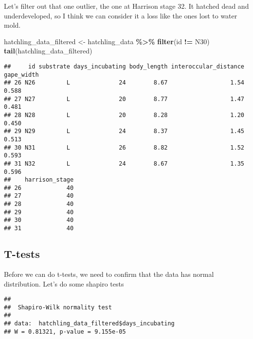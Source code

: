 \documentclass[
]{article}
\newenvironment{Shaded}{\begin{snugshade}}{\end{snugshade}}
\newcommand{\FunctionTok}[1]{\textcolor[rgb]{0.13,0.29,0.53}{\textbf{#1}}}
\newcommand{\NormalTok}[1]{#1}
\newcommand{\OtherTok}[1]{\textcolor[rgb]{0.56,0.35,0.01}{#1}}
\newcommand{\SpecialCharTok}[1]{\textcolor[rgb]{0.81,0.36,0.00}{\textbf{#1}}}
\newcommand{\StringTok}[1]{\textcolor[rgb]{0.31,0.60,0.02}{#1}}
\begin{document}
Let's filter out that one outlier, the one at Harrison stage 32. It
hatched dead and underdeveloped, so I think we can consider it a loss
like the ones lost to water mold.

\begin{Shaded}
\begin{Highlighting}[]
\NormalTok{hatchling\_data\_filtered }\OtherTok{\textless{}{-}}\NormalTok{ hatchling\_data }\SpecialCharTok{\%\textgreater{}\%} \FunctionTok{filter}\NormalTok{(id }\SpecialCharTok{!=} \StringTok{\textquotesingle{}N30\textquotesingle{}}\NormalTok{)}
\FunctionTok{tail}\NormalTok{(hatchling\_data\_filtered)}
\end{Highlighting}
\end{Shaded}

\begin{verbatim}
##     id substrate days_incubating body_length interoccular_distance gape_width
## 26 N26         L              24        8.67                  1.54      0.588
## 27 N27         L              20        8.77                  1.47      0.481
## 28 N28         L              20        8.28                  1.20      0.450
## 29 N29         L              24        8.37                  1.45      0.513
## 30 N31         L              26        8.82                  1.52      0.593
## 31 N32         L              24        8.67                  1.35      0.596
##    harrison_stage
## 26             40
## 27             40
## 28             40
## 29             40
## 30             40
## 31             40
\end{verbatim}

\subsection{T-tests}\label{t-tests}

Before we can do t-tests, we need to confirm that the data has normal
distribution. Let's do some shapiro tests

\begin{Shaded}
\end{Shaded}

\begin{verbatim}
## 
##  Shapiro-Wilk normality test
## 
## data:  hatchling_data_filtered$days_incubating
## W = 0.81321, p-value = 9.155e-05
\end{verbatim}
\end{document}
